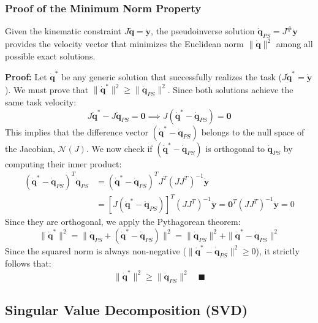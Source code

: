 \subsubsection{Proof of the Minimum Norm Property}
Given the kinematic constraint $J\dot{\mathbf{q}} = \dot{\mathbf{y}}$, the pseudoinverse solution $\dot{\mathbf{q}}_{PS} = J^\#\dot{\mathbf{y}}$ provides the velocity vector that minimizes the Euclidean norm $\|\dot{\mathbf{q}}\|^2$ among all possible exact solutions.

\textbf{Proof:} Let $\dot{\mathbf{q}}^*$ be any generic solution that successfully realizes the task ($J\dot{\mathbf{q}}^* = \dot{\mathbf{y}}$). We must prove that $\|\dot{\mathbf{q}}^*\|^2 \ge \|\dot{\mathbf{q}}_{PS}\|^2$.
Since both solutions achieve the same task velocity:
\begin{equation}
    J\dot{\mathbf{q}}^* - J\dot{\mathbf{q}}_{PS} = \mathbf{0} \implies J(\dot{\mathbf{q}}^* - \dot{\mathbf{q}}_{PS}) = \mathbf{0}
\end{equation}
This implies that the difference vector $(\dot{\mathbf{q}}^* - \dot{\mathbf{q}}_{PS})$ belongs to the null space of the Jacobian, $\mathcal{N}(J)$. We now check if $(\dot{\mathbf{q}}^* - \dot{\mathbf{q}}_{PS})$ is orthogonal to $\dot{\mathbf{q}}_{PS}$ by computing their inner product:
\begin{align}
    (\dot{\mathbf{q}}^* - \dot{\mathbf{q}}_{PS})^T \dot{\mathbf{q}}_{PS} &= (\dot{\mathbf{q}}^* - \dot{\mathbf{q}}_{PS})^T J^T (J J^T)^{-1} \dot{\mathbf{y}} \\
    &= \left[ J (\dot{\mathbf{q}}^* - \dot{\mathbf{q}}_{PS}) \right]^T (J J^T)^{-1} \dot{\mathbf{y}} = \mathbf{0}^T (J J^T)^{-1} \dot{\mathbf{y}} = 0
\end{align}
Since they are orthogonal, we apply the Pythagorean theorem:
\begin{equation}
    \|\dot{\mathbf{q}}^*\|^2 = \|\dot{\mathbf{q}}_{PS} + (\dot{\mathbf{q}}^* - \dot{\mathbf{q}}_{PS})\|^2 = \|\dot{\mathbf{q}}_{PS}\|^2 + \|\dot{\mathbf{q}}^* - \dot{\mathbf{q}}_{PS}\|^2
\end{equation}
Since the squared norm is always non-negative ($\|\dot{\mathbf{q}}^* - \dot{\mathbf{q}}_{PS}\|^2 \ge 0$), it strictly follows that:
\begin{equation}
    \|\dot{\mathbf{q}}^*\|^2 \ge \|\dot{\mathbf{q}}_{PS}\|^2 \quad \blacksquare
\end{equation}

\subsection{Singular Value Decomposition (SVD)}
\label{sec:SVD}

